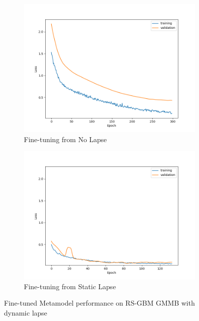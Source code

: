 \begin{figure}[ht!]
    \centering
    \begin{subfigure}{0.48\textwidth}
        \includegraphics[width=\textwidth]{./project3/figures/figure2a.png}
        \caption{Fine-tuning from No Lapse} 
        \label{subfig3-2:fromNolapse}
    \end{subfigure}\hfill
    \begin{subfigure}{0.48\textwidth}
        \includegraphics[width=\textwidth]{./project3/figures/figure2b.png}
        \caption{Fine-tuning from Static Lapse}
        \label{subfig3-2:fromLapse}
    \end{subfigure}
    \caption{Fine-tuned Metamodel performance on RS-GBM GMMB with dynamic lapse}
    \label{fig3:figure2}
\end{figure}

